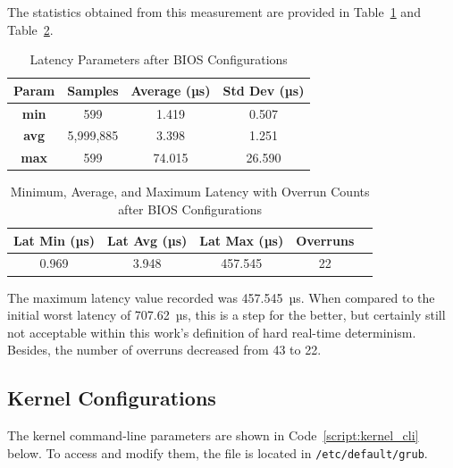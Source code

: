 \documentclass[MMR,Master,english]{style/twbook}
\begin{document}
\noindent The statistics obtained from this measurement are provided in Table~\ref{tab:latency_stats_virt_bios} and Table~\ref{tab:latency_overrun_msw_new_virt_bios}.

\begin{table}[H]
	\centering
	\caption{Latency Parameters after BIOS Configurations}
	\label{tab:latency_stats_virt_bios}
	\begin{tabular}{|c|c|c|c|}
		\hline
		\textbf{Param} & \textbf{Samples} & \textbf{Average (µs)} & \textbf{Std Dev (µs)} \\ \hline
		\textbf{min}   & 599              & 1.419                 & 0.507                 \\ \hline
		\textbf{avg}   & 5,999,885        & 3.398                 & 1.251                 \\ \hline
		\textbf{max}   & 599              & 74.015                & 26.590                \\ \hline
	\end{tabular}
\end{table}

\begin{table}[H]
	\centering
	\caption[Latency Statistics with Overrun Counts after BIOS Configurations]{Minimum, Average, and Maximum Latency with Overrun Counts after BIOS Configurations}
	\label{tab:latency_overrun_msw_new_virt_bios}
	\begin{tabular}{|c|c|c|c|c|}
		\hline
		\textbf{Lat Min (µs)} & \textbf{Lat Avg (µs)} & \textbf{Lat Max (µs)} & \textbf{Overruns} \\ \hline
		0.969                 & 3.948                 & 457.545               & 22                \\ \hline
	\end{tabular}
\end{table}

\noindent The maximum latency value recorded was 457.545~µs. When compared to the initial worst latency of 707.62~µs, this is a step for the better, but certainly still not acceptable within this work's definition of hard real-time determinism. Besides, the number of overruns decreased from 43 to 22.

\subsection{Kernel Configurations}\label{subsec:kernel_configurations}
The kernel command-line parameters are shown in Code~\ref{script:kernel_cli} below. To access and modify them, the file is located in \texttt{/etc/default/grub}.
\end{document}
